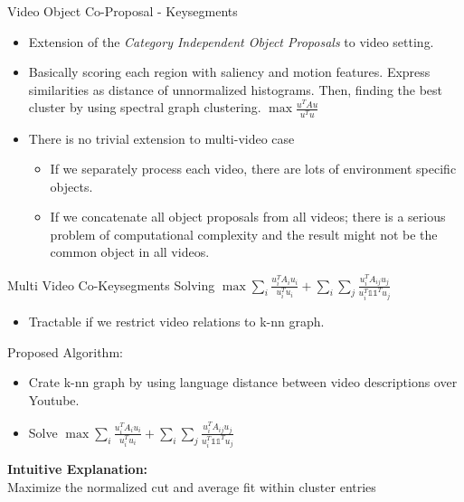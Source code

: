 \begin{frame}{Video Object Co-Proposal - Keysegments}
\begin{itemize}
\item Extension of the \emph{Category Independent Object Proposals} to video setting.
\item Basically scoring each region with saliency and motion features. Express similarities as distance of unnormalized histograms. Then, finding the best cluster by using spectral graph clustering. $\max \frac{u^TAu}{u^Tu}$
\item There is no trivial extension to multi-video case
\begin{itemize}
\item If we separately process each video, there are lots of environment specific objects.
\item If we concatenate all object proposals from all videos; there is a serious problem of computational complexity and the result might not be the common object in all videos.
\end{itemize}
\end{itemize}
\end{frame}

\begin{frame}{Multi Video Co-Keysegments}
Solving $\max \sum_{i} \frac{u_i^TA_iu_i}{u_i^Tu_i} + \sum_{i}\sum_{j} \frac{u_i^TA_{ij}u_j}{u_i^T \mathds{1} \mathds{1}^Tu_j}$
\begin{itemize}
\item Tractable if we restrict video relations to k-nn graph.
\end{itemize}
Proposed Algorithm:
\begin{itemize}
\item Crate k-nn graph by using language distance between video descriptions over Youtube.
\item Solve $\max \sum_{i} \frac{u_i^TA_iu_i}{u_i^Tu_i} + \sum_{i}\sum_{j} \frac{u_i^TA_{ij}u_j}{u_i^T \mathds{1} \mathds{1}^Tu_j}$
\end{itemize}

{\bf Intuitive Explanation:} \\
Maximize the normalized cut and average fit within cluster entries

\end{frame}



